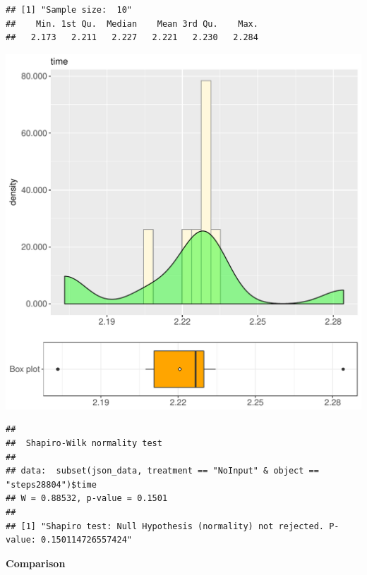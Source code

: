 \documentclass{article}\usepackage[]{graphicx}\usepackage[]{color}
\makeatletter
\def\maxwidth{ %
  \ifdim\Gin@nat@width>\linewidth
    \linewidth
  \else
    \Gin@nat@width
  \fi
}
\newenvironment{kframe}{%
 \def\at@end@of@kframe{}%
 \ifinner\ifhmode%
  \def\at@end@of@kframe{\end{minipage}}%
  \begin{minipage}{\columnwidth}%
 \fi\fi%
 \def\FrameCommand##1{\hskip\@totalleftmargin \hskip-\fboxsep
 \colorbox{shadecolor}{##1}\hskip-\fboxsep
     \hskip-\linewidth \hskip-\@totalleftmargin \hskip\columnwidth}%
 \MakeFramed {\advance\hsize-\width
   \@totalleftmargin\z@ \linewidth\hsize
   \@setminipage}}%
 {\par\unskip\endMakeFramed%
 \at@end@of@kframe}
\newenvironment{knitrout}{}{} %
\makeatother
\begin{document}
\begin{knitrout}
\color{fgcolor}\begin{kframe}
\begin{verbatim}
## [1] "Sample size:  10"
##    Min. 1st Qu.  Median    Mean 3rd Qu.    Max. 
##   2.173   2.211   2.227   2.221   2.230   2.284
\end{verbatim}
\end{kframe}
\includegraphics[width=\maxwidth]{figure/RH4_NoInput_steps28804-1} 
\begin{kframe}\begin{verbatim}
## 
## 	Shapiro-Wilk normality test
## 
## data:  subset(json_data, treatment == "NoInput" & object == "steps28804")$time
## W = 0.88532, p-value = 0.1501
## 
## [1] "Shapiro test: Null Hypothesis (normality) not rejected. P-value: 0.150114726557424"
\end{verbatim}
\end{kframe}
\end{knitrout}
  
 \textbf{Comparison}
  
\end{document}
